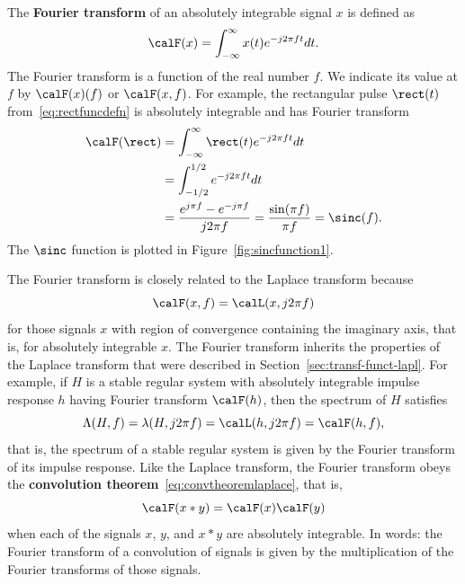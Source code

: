 \documentclass[11pt,a4paper]{book}
\theoremstyle{plain}
\numberwithin{equation}{section}
\newcommand{\term}{\textbf}
\begin{document}
The \term{Fourier transform} of an absolutely integrable signal $x$ is defined as
\begin{equation}\label{eq:fouriertransform}
\calF(x) = \int_{-\infty}^\infty x(t) e^{-j2\pi ft} dt.
\end{equation}
The Fourier transform is a function of the real number $f$. We indicate its value at $f$ by $\calF(x)(f)$ or $\calF(x,f)$. For example, the rectangular pulse $\rect(t)$ from~\eqref{eq:rectfuncdefn} is absolutely integrable and has Fourier transform
\begin{align}
\calF(\rect) &= \int_{-\infty}^\infty \rect(t) e^{-j2\pi ft} dt \nonumber \\
&= \int_{-1/2}^{1/2} e^{-j2\pi ft} dt \nonumber  \\
&= \frac{e^{j\pi f} - e^{-j\pi f}}{j 2 \pi f} = \frac{\sin(\pi f)}{\pi f} = \sinc(f). \label{eq:sincandrect}
\end{align}
The $\sinc$ function is plotted in Figure~\ref{fig:sincfunction1}.  %

The Fourier transform is closely related to the Laplace transform because
\[
\calF(x,f) = \calL(x,j 2\pi f)
\]
for those signals $x$ with region of convergence containing the imaginary axis, that is, for absolutely integrable $x$.  The Fourier transform inherits the properties of the Laplace transform that were described in Section~\ref{sec:transf-funct-lapl}.  For example, if $H$ is a stable regular system with absolutely integrable impulse response $h$ having Fourier transform $\calF(h)$, then the spectrum of $H$ satisfies
\[
\Lambda(H, f) = \lambda(H,j2\pi f) = \calL(h,j2\pi f) = \calF(h,f),
\]
that is, the spectrum of a stable regular system is given by the Fourier transform of its impulse response.  
 Like the Laplace transform, the Fourier transform obeys the \term{convolution theorem}~\eqref{eq:convtheoremlaplace}, that is,
 \begin{equation}\label{eq:convthmfouriertransform}
 \calF(x * y) = \calF(x)\calF(y)
 \end{equation}
when each of the signals $x$, $y$, and $x * y$ are absolutely integrable.  In words: the Fourier transform of a convolution of signals is given by the multiplication of the Fourier transforms of those signals.
\end{document}
